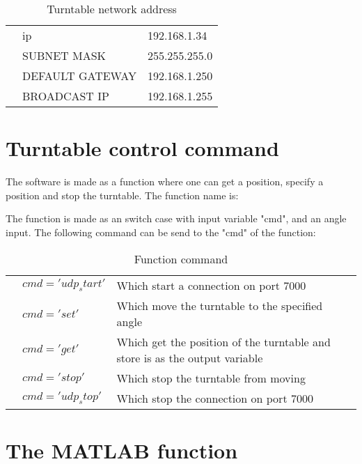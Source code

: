 \begin{table}[H]
\centering
\caption{Turntable network address}
\label{my-label}
\begin{tabular}{lll}
 & \gls{ip} & 192.168.1.34   \\
 & SUBNET MASK  & 255.255.255.0   \\
 & DEFAULT GATEWAY  & 192.168.1.250  \\
 & BROADCAST IP   &  192.168.1.255   
\end{tabular}
\end{table}



\section*{Turntable control command}
The software is made as a function where one can get a position, specify a position and stop the turntable. The function name is:


The function is made as an switch case with input variable "cmd", and an angle input. The following command can be send to the "cmd" of the function:

 \begin{table}[H]
\centering
\caption{Function command}
\label{my-label}
\begin{tabular}{lll}
 & $cmd = 'udp_start'$ & Which start a connection on port 7000 \\
 & $cmd = 'set'$ & Which move the turntable to the specified angle    \\
 & $cmd = 'get'$ & Which get the position of the turntable and store is as the output variable   \\
 & $cmd = 'stop'$  & Which stop the turntable from moving \\
 & $cmd = 'udp_stop'$ & Which stop the connection on port 7000 
\end{tabular}
\end{table}




\section*{The MATLAB function}





